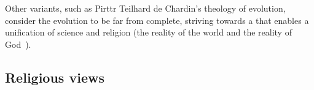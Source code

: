Other variants, such as Pirttr Teilhard de Chardin's theology of evolution, consider the evolution to be far from complete, striving towards a  that enables a unification of science and religion (the reality of the world and the reality of God~\cite{teilhard1971christianity}).


\subsection{Religious views}


